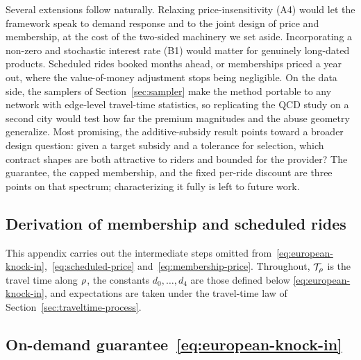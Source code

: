 \documentclass[12pt]{article}
\begin{document}
{{{{{{{{Several extensions follow naturally. Relaxing price-insensitivity (A4) would let
the framework speak to demand response and to the joint design of price and
membership, at the cost of the two-sided machinery we set aside. Incorporating a
non-zero and stochastic interest rate (B1) would matter for genuinely long-dated
products. Scheduled rides booked months ahead, or memberships priced a year
out, where the value-of-money adjustment stops being negligible. On the data
side, the samplers of Section~\ref{sec:sampler} make the method portable to any
network with edge-level travel-time statistics, so replicating the QCD study on
a second city would test how far the premium magnitudes and the abuse geometry
generalize. Most promising, the additive-subsidy result points toward a broader
design question: given a target subsidy and a tolerance for selection, which
contract shapes are both attractive to riders and bounded for the provider? The
guarantee, the capped membership, and the fixed per-ride discount are three
points on that spectrum; characterizing it fully is left to future work.
 

\begin{appendices}

\section{Derivation of membership and scheduled rides}\label{app:derivations}

This appendix carries out the intermediate steps omitted
from~\eqref{eq:european-knock-in},~\eqref{eq:scheduled-price}
and~\eqref{eq:membership-price}. Throughout, $\mathcal{T}_\rho$ is the travel time along
$\rho$, the constants $d_0,\dots,d_4$ are those defined below
\eqref{eq:european-knock-in}, and expectations are taken under the travel-time
law of Section~\ref{sec:traveltime-process}.

\subsection*{On-demand guarantee~\eqref{eq:european-knock-in}}


\end{appendices}}}}}}}}}
\end{document}

